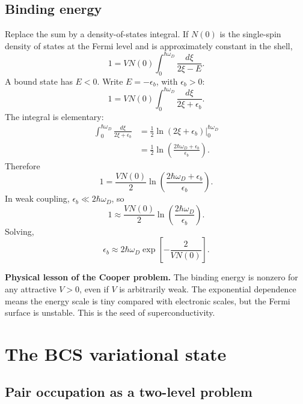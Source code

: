 \documentclass[11pt]{article}
\numberwithin{equation}{section}
\newcommand{\Nzero}{N(0)}
\begin{document}
\subsection{Binding energy}

Replace the sum by a density-of-states integral. If $\Nzero$ is the single-spin density of states at the Fermi level and is approximately constant in the shell,
\begin{equation}
1=V\Nzero\int_0^{\hbar\omega_D}\frac{d\xi}{2\xi-E}.
\end{equation}
A bound state has $E<0$. Write $E=-\epsilon_b$, with $\epsilon_b>0$:
\begin{equation}
1=V\Nzero\int_0^{\hbar\omega_D}\frac{d\xi}{2\xi+\epsilon_b}.
\end{equation}
The integral is elementary:
\begin{align}
\int_0^{\hbar\omega_D}\frac{d\xi}{2\xi+\epsilon_b}
&=\frac{1}{2}\ln(2\xi+\epsilon_b)\bigg|_0^{\hbar\omega_D}\\
&=\frac{1}{2}\ln\left(\frac{2\hbar\omega_D+\epsilon_b}{\epsilon_b}\right).
\end{align}
Therefore
\begin{equation}
1=\frac{V\Nzero}{2}\ln\left(\frac{2\hbar\omega_D+\epsilon_b}{\epsilon_b}\right).
\end{equation}
In weak coupling, $\epsilon_b\ll 2\hbar\omega_D$, so
\begin{equation}
1\approx \frac{V\Nzero}{2}\ln\left(\frac{2\hbar\omega_D}{\epsilon_b}\right).
\end{equation}
Solving,
\begin{equation}
\epsilon_b\approx 2\hbar\omega_D\exp\left[-\frac{2}{V\Nzero}\right].
\label{eq:cooper_binding}
\end{equation}

\begin{physicsbox}
\textbf{Physical lesson of the Cooper problem.} The binding energy is nonzero for any attractive $V>0$, even if $V$ is arbitrarily weak. The exponential dependence means the energy scale is tiny compared with electronic scales, but the Fermi surface is unstable. This is the seed of superconductivity.
\end{physicsbox}

\section{The BCS variational state}

\subsection{Pair occupation as a two-level problem}
\end{document}

